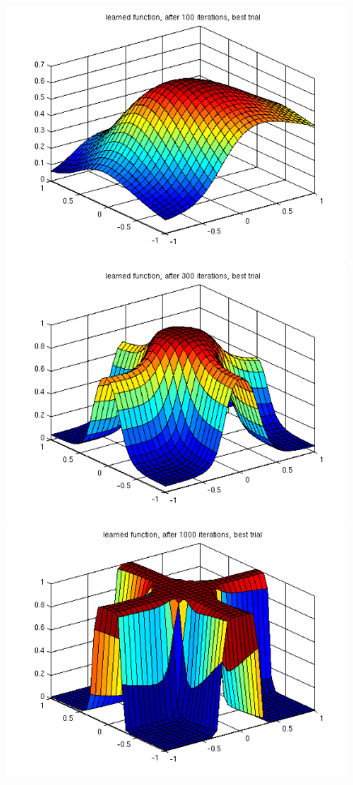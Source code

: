 \begin{figure}[hp!]
\begin{center}
\begin{minipage}{0.48\textwidth}
 \includegraphics[width=0.99\textwidth]{./figures/1/learned_best_100}
 \end{minipage}
 \begin{minipage}{0.48\textwidth}
 \includegraphics[width=0.99\textwidth]{./figures/1/learned_best_300}
 \end{minipage}
 \begin{minipage}{0.48\textwidth}
 \includegraphics[width=0.99\textwidth]{./figures/1/learned_best_1000}

\end{minipage}
\end{center}
\end{figure}

